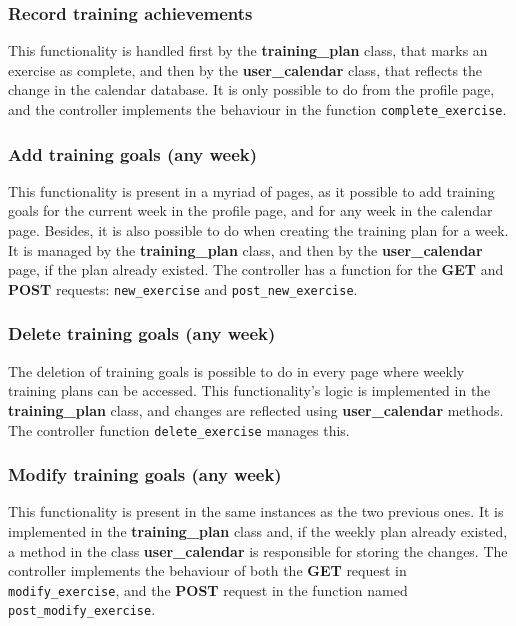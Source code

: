 \documentclass[12pt,twoside,titlepage,a4paper]{article}
\theoremstyle{definicion}
\theoremstyle{lema}
\theoremstyle{teorema}
\theoremstyle{corolario}
\theoremstyle{ejemplo}
\theoremstyle{nota}
\begin{document}
\subsubsection{Record training achievements}

This functionality is handled first by the \textbf{training\_plan} class, that marks an exercise as complete, and then by the
\textbf{user\_calendar} class, that reflects the change in the calendar database. It is only possible to do from the profile
page, and the controller implements the behaviour in the function \texttt{complete\_exercise}.

\subsubsection{Add training goals (any week)} 

This functionality is present in a myriad of pages, as it possible to add training goals for the current week in the profile page,
and for any week in the calendar page. Besides, it is also possible to do when creating the training plan for a week. It is managed
by the \textbf{training\_plan} class, and then by the \textbf{user\_calendar} page, if the plan already existed. The controller has a
function for the \textbf{GET} and \textbf{POST} requests: \texttt{new\_exercise} and \texttt{post\_new\_exercise}.

\subsubsection{Delete training goals (any week)}

The deletion of training goals is possible to do in every page where weekly training plans can be accessed. This functionality's logic
is implemented in the \textbf{training\_plan} class, and changes are reflected using \textbf{user\_calendar} methods. The controller 
function \texttt{delete\_exercise} manages this.

\subsubsection{Modify training goals (any week)}

This functionality is present in the same instances as the two previous ones. It is implemented in the \textbf{training\_plan} class
and, if the weekly plan already existed, a method in the class \textbf{user\_calendar} is responsible for storing the changes. The 
controller implements the behaviour of both the \textbf{GET} request in \texttt{modify\_exercise}, and the \textbf{POST} request in the
function named \texttt{post\_modify\_exercise}.
\end{document}
